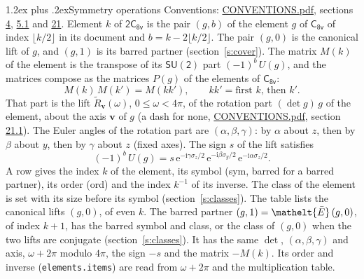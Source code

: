 \documentclass[10pt,a4paper]{article}
\makeatletter
\renewcommand\section{\@startsection{section}{1}{\z@}{-3ex plus -1ex minus -.2ex}%
  {1.2ex plus .2ex}{\normalfont\large\sffamily\bfseries\color{parttitle}}}
\numberwithin{equation}{section}
\newcommand{\eltfont}[1]{{\let\sigma\eltsigma\mathelt{#1}}}
\newcommand{\grp}[1]{\mathsf{#1}}
\newcommand{\elt}[1]{\eltfont{#1}}
\newcommand{\vv}{\mathbf{v}}
\newcommand{\iunit}{\mathrm{i}}
\newcommand{\expe}{\mathrm{e}}
\newcommand{\barred}[1]{\bar{#1}}
\newcommand{\lift}[1]{\tilde{#1}}
\newcommand{\pauli}[1]{\sigma_{#1}}
\makeatother
\begin{document}
\section{Symmetry operations}\label{s:elements}
Conventions: \href{../../CONVENTIONS.pdf}{CONVENTIONS.pdf}, sections \href{../../../rotation/CONVENTIONS.pdf\#conv.4}{4}, \href{../../../rotation/CONVENTIONS.pdf\#conv.5.1}{5.1} and \href{../../CONVENTIONS.pdf\#conv.21}{21}.
\leavevmode\label{n:index.element}\label{n:element.g}Element $k$ of $\grp{2C_{8v}}$ is the pair $(g, b)$ of the element $g$ of \href{../../../rotation/data/pdf/C8v.pdf}{$\grp{C_{8v}}$} of index $\lfloor k/2\rfloor$ in its document and $b = k - 2\lfloor k/2\rfloor$. The pair $(g, 0)$ is the canonical lift of $g$, and $(g, 1)$ is its barred partner (section~\ref{s:cover}). \label{n:matrix.element.pin}\label{n:matrix.element}The matrix $M(k)$ of the element is the transpose of its $\grp{SU(2)}$ part $(-1)^{b}\,U(g)$, and the matrices compose as the matrices $P(g)$ of the elements of $\grp{C_{8v}}$:
\begin{equation}\label{e:mprod}M(k)\,M(k') = M(kk'),\qquad kk' = \text{first } k\text{, then } k'.\end{equation}
\leavevmode\label{n:angle.omega}\label{n:vector.axis}\label{n:vector.pole}That part is the lift $\lift{R}_{\vv}(\omega)$, $0 \le \omega < 4\pi$, of the rotation part $(\det g)\,g$ of the element, about the axis $\vv$ of $g$ (a dash for none, \href{../../CONVENTIONS.pdf}{CONVENTIONS.pdf}, section \href{../../CONVENTIONS.pdf\#conv.21.1}{21.1}). \label{n:angle.euler.alpha}\label{n:angle.euler.beta}\label{n:angle.euler.gamma}\label{n:vector.coordinates}The Euler angles of the rotation part are $(\alpha,\beta,\gamma)$: by $\alpha$ about $z$, then by $\beta$ about $y$, then by $\gamma$ about $z$ (fixed axes). \label{n:local.euler.sign}The sign $s$ of the lift satisfies
\begin{equation}\label{e:euler}(-1)^{b}\,U(g) = s\,\expe^{-\iunit\gamma\pauli{z}/2}\,\expe^{-\iunit\beta\pauli{y}/2}\,\expe^{-\iunit\alpha\pauli{z}/2}.\end{equation}
\leavevmode\label{n:index.element.inverse}\label{n:head.sym}\label{n:head.ord}A row gives the index $k$ of the element, its symbol (sym, barred for a barred partner), its order (ord) and the index $k^{-1}$ of its inverse. \label{n:head.class}The class of the element is set with its size before its symbol (section~\ref{s:classes}).
The table lists the canonical lifts $(g, 0)$, of even $k$. The barred partner $(g, 1) = \elt{\barred{E}}\,(g, 0)$, of index $k + 1$, has the barred symbol and class, or the class of $(g, 0)$ when the two lifts are conjugate (section~\ref{s:classes}). It has the same $\det$, $(\alpha,\beta,\gamma)$ and axis, $\omega + 2\pi$ modulo $4\pi$, the sign $-s$ and the matrix $-M(k)$. Its order and inverse (\texttt{elements.items}) are read from $\omega + 2\pi$ and the multiplication table.
\end{document}
